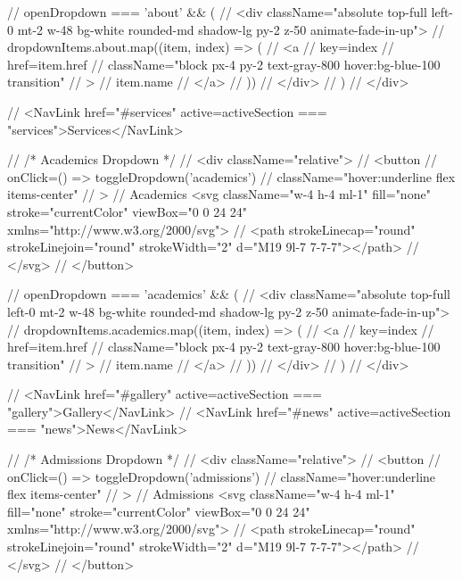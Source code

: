 {//             {openDropdown === 'about' && (
//               <div className="absolute top-full left-0 mt-2 w-48 bg-white rounded-md shadow-lg py-2 z-50 animate-fade-in-up">
//                 {dropdownItems.about.map((item, index) => (
//                   <a 
//                     key={index} 
//                     href={item.href} 
//                     className="block px-4 py-2 text-gray-800 hover:bg-blue-100 transition"
//                   >
//                     {item.name}
//                   </a>
//                 ))}
//               </div>
//             )}
//           </div>
          
//           <NavLink href="#services" active={activeSection === "services"}>Services</NavLink>
          
//           {/* Academics Dropdown */}
//           <div className="relative">
//             <button 
//               onClick={() => toggleDropdown('academics')}
//               className="hover:underline flex items-center"
//             >
//               Academics <svg className="w-4 h-4 ml-1" fill="none" stroke="currentColor" viewBox="0 0 24 24" xmlns="http://www.w3.org/2000/svg">
//                 <path strokeLinecap="round" strokeLinejoin="round" strokeWidth="2" d="M19 9l-7 7-7-7"></path>
//               </svg>
//             </button>
            
//             {openDropdown === 'academics' && (
//               <div className="absolute top-full left-0 mt-2 w-48 bg-white rounded-md shadow-lg py-2 z-50 animate-fade-in-up">
//                 {dropdownItems.academics.map((item, index) => (
//                   <a 
//                     key={index} 
//                     href={item.href} 
//                     className="block px-4 py-2 text-gray-800 hover:bg-blue-100 transition"
//                   >
//                     {item.name}
//                   </a>
//                 ))}
//               </div>
//             )}
//           </div>
          
//           <NavLink href="#gallery" active={activeSection === "gallery"}>Gallery</NavLink>
//           <NavLink href="#news" active={activeSection === "news"}>News</NavLink>
          
//           {/* Admissions Dropdown */}
//           <div className="relative">
//             <button 
//               onClick={() => toggleDropdown('admissions')}
//               className="hover:underline flex items-center"
//             >
//               Admissions <svg className="w-4 h-4 ml-1" fill="none" stroke="currentColor" viewBox="0 0 24 24" xmlns="http://www.w3.org/2000/svg">
//                 <path strokeLinecap="round" strokeLinejoin="round" strokeWidth="2" d="M19 9l-7 7-7-7"></path>
//               </svg>
//             </button>
            
}
